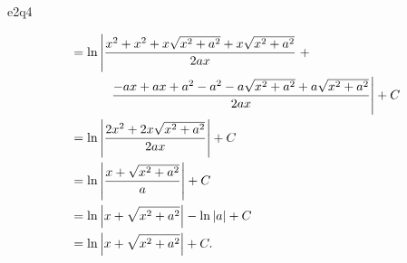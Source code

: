 \documentclass[reqno]{alittlebear}
\begin{document}
\begin{exercise}{}{}
\begin{question}{}{e2q4}
\begin{mathnote}
\begin{align*}
                &=\ln\left|\frac{x^2+x^2+x\sqrt{x^2+a^2}+x\sqrt{x^2+a^2}}{2ax}\right.+\\
                &\quad\quad\quad\left.\frac{-ax+ax+a^2-a^2-a\sqrt{x^2+a^2}+a\sqrt{x^2+a^2}}{2ax}\right|+C\\
                &=\ln\left|\frac{2x^2+2x\sqrt{x^2+a^2}}{2ax}\right|+C\\
                &=\ln\left|\frac{x+\sqrt{x^2+a^2}}{a}\right|+C\\
                &=\ln\left|x+\sqrt{x^2+a^2}\right|-\ln\left|a\right|+C\\
                &=\ln\left|x+\sqrt{x^2+a^2}\right|+C.\\
            \end{align*}
        \end{mathnote}
    \end{question}
\end{exercise}
\end{document}
